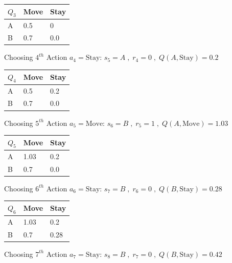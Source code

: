 \documentclass[a4paper]{article}
\theoremstyle{definition}
\newenvironment{soln}{
    \leavevmode\color{blue}\ignorespaces
}{}
\begin{document}
\begin{enumerate}
\begin{soln}
\begin{center}
            \begin{tabular}{ | m{5em} | m{5em}| m{5em} |} 
            \hline
            $Q_{3}$ & Move & Stay \\ 
            \hline
            A & 0.5 & 0  \\
            \hline
            B & 0.7 & 0.0 \\ 
            \hline
            \end{tabular}
        \end{center}
Choosing $4^{th}$ Action $a_{4} = \text{Stay}$: $s_{5}=A\;,\;r_{4}=0\;,\;Q(A,\text{Stay}) = 0.2$
        \begin{center}
            \begin{tabular}{ | m{5em} | m{5em}| m{5em} |} 
            \hline
            $Q_{4}$ & Move & Stay \\ 
            \hline
            A & 0.5 & 0.2  \\
            \hline
            B & 0.7 & 0.0 \\ 
            \hline
            \end{tabular}
        \end{center}
Choosing $5^{th}$ Action $a_{5} = \text{Move}$: $s_{6}=B\;,\;r_{5}=1\;,\;Q(A,\text{Move}) = 1.03$
        \begin{center}
            \begin{tabular}{ | m{5em} | m{5em}| m{5em} |} 
            \hline
            $Q_{5}$ & Move & Stay \\ 
            \hline
            A & 1.03 & 0.2  \\
            \hline
            B & 0.7 & 0.0 \\ 
            \hline
            \end{tabular}
        \end{center}
Choosing $6^{th}$ Action $a_{6} = \text{Stay}$: $s_{7}=B\;,\;r_{6}=0\;,\;Q(B,\text{Stay}) = 0.28$
        \begin{center}
            \begin{tabular}{ | m{5em} | m{5em}| m{5em} |} 
            \hline
            $Q_{6}$ & Move & Stay \\ 
            \hline
            A & 1.03 & 0.2  \\
            \hline
            B & 0.7 & 0.28 \\ 
            \hline
            \end{tabular}
        \end{center}
Choosing $7^{th}$ Action $a_{7} = \text{Stay}$: $s_{8}=B\;,\;r_{7}=0\;,\;Q(B,\text{Stay}) = 0.42$

\end{soln}
\end{enumerate}
\end{document}
